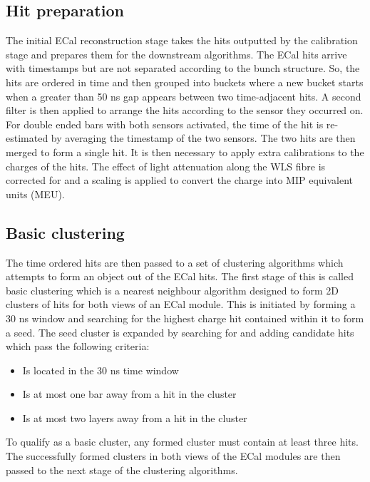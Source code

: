 \subsection{Hit preparation}
\label{subsec:ECalHitPerparation}
The initial ECal reconstruction stage takes the hits outputted by the calibration stage and prepares them for the downstream algorithms.  The ECal hits arrive with timestamps but are not separated according to the bunch structure.  So, the hits are ordered in time and then grouped into buckets where a new bucket starts when a greater than 50 ns gap appears between two time-adjacent hits.  A second filter is then applied to arrange the hits according to the sensor they occurred on.  For double ended bars with both sensors activated, the time of the hit is re-estimated by averaging the timestamp of the two sensors.  The two hits are then merged to form a single hit.
\newline
It is then necessary to apply extra calibrations to the charges of the hits.  The effect of light attenuation along the WLS fibre is corrected for and a scaling is applied to convert the charge into MIP equivalent units (MEU).

\subsection{Basic clustering}
\label{subsec:ECalBasicClustering}
The time ordered hits are then passed to a set of clustering algorithms which attempts to form an object out of the ECal hits.  The first stage of this is called basic clustering which is a nearest neighbour algorithm designed to form 2D clusters of hits for both views of an ECal module.  This is initiated by forming a 30 ns window and searching for the highest charge hit contained within it to form a seed.  The seed cluster is expanded by searching for and adding candidate hits which pass the following criteria:
\begin{itemize}
  \item Is located in the 30 ns time window
  \item Is at most one bar away from a hit in the cluster
  \item Is at most two layers away from a hit in the cluster
\end{itemize}
To qualify as a basic cluster, any formed cluster must contain at least three hits.  The successfully formed clusters in both views of the ECal modules are then passed to the next stage of the clustering algorithms. 

